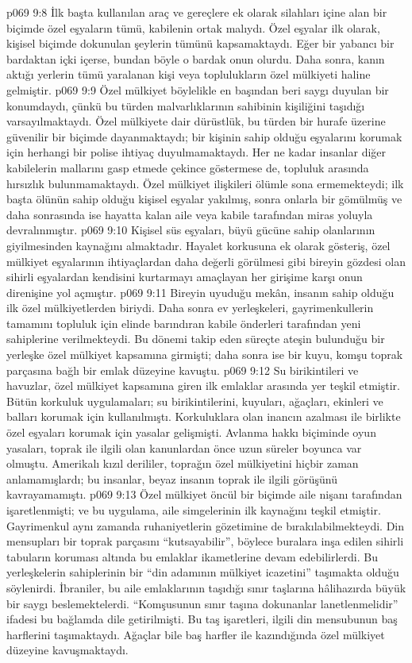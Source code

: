 \vs p069 9:8 İlk başta kullanılan araç ve gereçlere ek olarak silahları içine alan bir biçimde özel eşyaların tümü, kabilenin ortak malıydı. Özel eşyalar ilk olarak, kişisel biçimde dokunulan şeylerin tümünü kapsamaktaydı. Eğer bir yabancı bir bardaktan içki içerse, bundan böyle o bardak onun olurdu. Daha sonra, kanın aktığı yerlerin tümü yaralanan kişi veya toplulukların özel mülkiyeti haline gelmiştir.
\vs p069 9:9 Özel mülkiyet böylelikle en başından beri saygı duyulan bir konumdaydı, çünkü bu türden malvarlıklarının sahibinin kişiliğini taşıdığı varsayılmaktaydı. Özel mülkiyete dair dürüstlük, bu türden bir hurafe üzerine güvenilir bir biçimde dayanmaktaydı; bir kişinin sahip olduğu eşyalarını korumak için herhangi bir polise ihtiyaç duyulmamaktaydı. Her ne kadar insanlar diğer kabilelerin mallarını gasp etmede çekince göstermese de, topluluk arasında hırsızlık bulunmamaktaydı. Özel mülkiyet ilişkileri ölümle sona ermemekteydi; ilk başta ölünün sahip olduğu kişisel eşyalar yakılmış, sonra onlarla bir gömülmüş ve daha sonrasında ise hayatta kalan aile veya kabile tarafından miras yoluyla devralınmıştır.
\vs p069 9:10 Kişisel süs eşyaları, büyü gücüne sahip olanlarının giyilmesinden kaynağını almaktadır. Hayalet korkusuna ek olarak gösteriş, özel mülkiyet eşyalarının ihtiyaçlardan daha değerli görülmesi gibi bireyin gözdesi olan sihirli eşyalardan kendisini kurtarmayı amaçlayan her girişime karşı onun direnişine yol açmıştır.
\vs p069 9:11 Bireyin uyuduğu mekân, insanın sahip olduğu ilk özel mülkiyetlerden biriydi. Daha sonra ev yerleşkeleri, gayrimenkullerin tamamını topluluk için elinde barındıran kabile önderleri tarafından yeni sahiplerine verilmekteydi. Bu dönemi takip eden süreçte ateşin bulunduğu bir yerleşke özel mülkiyet kapsamına girmişti; daha sonra ise bir kuyu, komşu toprak parçasına bağlı bir emlak düzeyine kavuştu.
\vs p069 9:12 Su birikintileri ve havuzlar, özel mülkiyet kapsamına giren ilk emlaklar arasında yer teşkil etmiştir. Bütün korkuluk uygulamaları; su birikintilerini, kuyuları, ağaçları, ekinleri ve balları korumak için kullanılmıştı. Korkuluklara olan inancın azalması ile birlikte özel eşyaları korumak için yasalar gelişmişti. Avlanma hakkı biçiminde oyun yasaları, toprak ile ilgili olan kanunlardan önce uzun süreler boyunca var olmuştu. Amerikalı kızıl derililer, toprağın özel mülkiyetini hiçbir zaman anlamamışlardı; bu insanlar, beyaz insanın toprak ile ilgili görüşünü kavrayamamıştı.
\vs p069 9:13 Özel mülkiyet öncül bir biçimde aile nişanı tarafından işaretlenmişti; ve bu uygulama, aile simgelerinin ilk kaynağını teşkil etmiştir. Gayrimenkul aynı zamanda ruhaniyetlerin gözetimine de bırakılabilmekteydi. Din mensupları bir toprak parçasını “kutsayabilir”, böylece buralara inşa edilen sihirli tabuların koruması altında bu emlaklar ikametlerine devam edebilirlerdi. Bu yerleşkelerin sahiplerinin bir “din adamının mülkiyet icazetini” taşımakta olduğu söylenirdi. İbraniler, bu aile emlaklarının taşıdığı sınır taşlarına hâlihazırda büyük bir saygı beslemektelerdi. “Komşusunun sınır taşına dokunanlar lanetlenmelidir” ifadesi bu bağlamda dile getirilmişti. Bu taş işaretleri, ilgili din mensubunun baş harflerini taşımaktaydı. Ağaçlar bile baş harfler ile kazındığında özel mülkiyet düzeyine kavuşmaktaydı.
